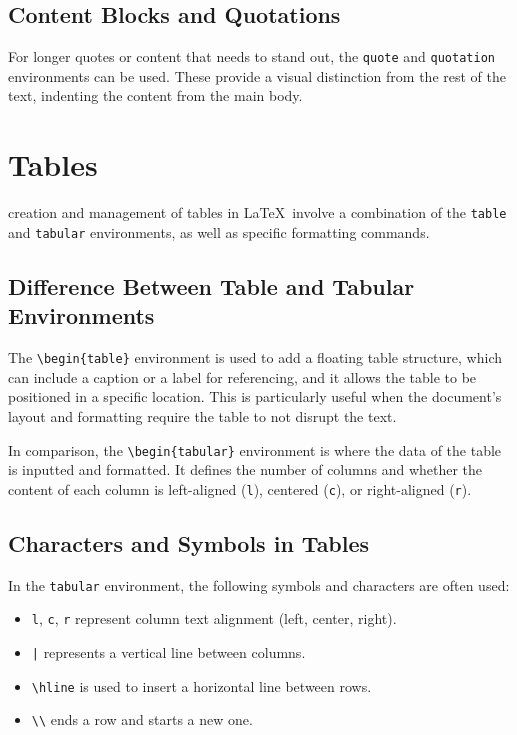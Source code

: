 \documentclass[12pt,journal,compsoc]{IEEEtran}
\begin{document}
\subsection{Content Blocks and Quotations}

For longer quotes or content that needs to stand out, the \texttt{quote} and \texttt{quotation} environments can be used. These provide a visual distinction from the rest of the text, indenting the content from the main body.

\section{Tables}

 creation and management of tables in \LaTeX\ involve a combination of the \texttt{table} and \texttt{tabular} environments, as well as specific formatting commands.

\subsection{Difference Between Table and Tabular Environments}

The \texttt{\textbackslash begin\{table\}} environment is used to add a floating table structure, which can include a caption or a label for referencing, and it allows the table to be positioned in a specific location. This is particularly useful when the document's layout and formatting require the table to not disrupt the text.

In comparison, the \texttt{\textbackslash begin\{tabular\}} environment is where the data of the table is inputted and formatted. It defines the number of columns and whether the content of each column is left-aligned (\texttt{l}), centered (\texttt{c}), or right-aligned (\texttt{r}).

\subsection{Characters and Symbols in Tables}

In the \texttt{tabular} environment, the following symbols and characters are often used:
\begin{itemize}
    \item \texttt{l}, \texttt{c}, \texttt{r} represent column text alignment (left, center, right).
    \item \texttt{|} represents a vertical line between columns.
    \item \texttt{\textbackslash hline} is used to insert a horizontal line between rows.
    \item \texttt{\textbackslash\textbackslash} ends a row and starts a new one.
\end{itemize}
\end{document}
